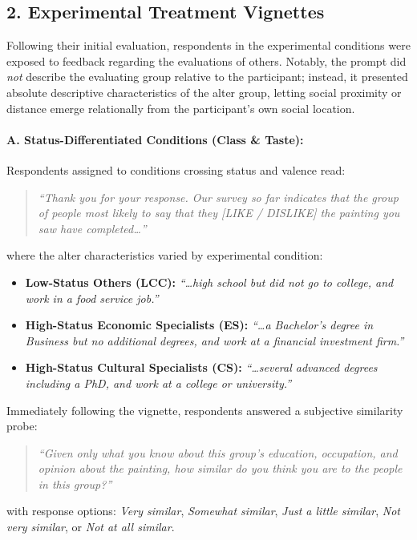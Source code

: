 \documentclass[12pt, letterpaper]{article}
\begin{document}
\subsection*{2. Experimental Treatment Vignettes}
Following their initial evaluation, respondents in the experimental conditions were exposed to feedback regarding the evaluations of others. Notably, the prompt did \textit{not} describe the evaluating group relative to the participant; instead, it presented absolute descriptive characteristics of the alter group, letting social proximity or distance emerge relationally from the participant's own social location.

\paragraph{A. Status-Differentiated Conditions (Class \& Taste):}
Respondents assigned to conditions crossing status and valence read:
\begin{quote}
\textit{``Thank you for your response. Our survey so far indicates that the group of people most likely to say that they [LIKE / DISLIKE] the painting you saw have completed\dots''}
\end{quote}
where the alter characteristics varied by experimental condition:
\begin{itemize}
    \item \textbf{Low-Status Others (LCC):} \textit{``\dots high school but did not go to college, and work in a food service job.''}
    \item \textbf{High-Status Economic Specialists (ES):} \textit{``\dots a Bachelor's degree in Business but no additional degrees, and work at a financial investment firm.''}
    \item \textbf{High-Status Cultural Specialists (CS):} \textit{``\dots several advanced degrees including a PhD, and work at a college or university.''}
\end{itemize}

Immediately following the vignette, respondents answered a subjective similarity probe:
\begin{quote}
\textit{``Given only what you know about this group's education, occupation, and opinion about the painting, how similar do you think you are to the people in this group?''}
\end{quote}
with response options: \textit{Very similar}, \textit{Somewhat similar}, \textit{Just a little similar}, \textit{Not very similar}, or \textit{Not at all similar}.
\end{document}
